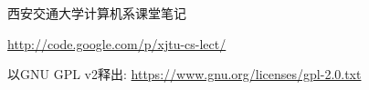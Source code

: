\clearpage

\sf \Large

西安交通大学计算机系课堂笔记

\url{http://code.google.com/p/xjtu-cs-lect/}

\vskip 1cm

以GNU GPL v2释出: \url{https://www.gnu.org/licenses/gpl-2.0.txt}

\rm \normalsize
\thispagestyle{empty}
\setcounter{page}{0}
\clearpage
